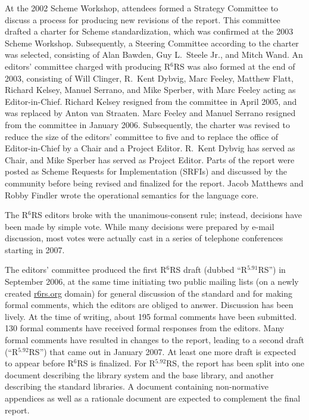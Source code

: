 \documentclass{sigplanconf}
\newcommand{\rn}[1]{R$^{#1}$RS}
\begin{document}
At the 2002 Scheme Workshop, attendees formed a Strategy Committee to
discuss a process for producing new revisions of the report.  This
committee drafted a charter for Scheme standardization, which was
confirmed at the 2003 Scheme Workshop.  Subsequently, a Steering
Committee according to the charter was selected, consisting of Alan
Bawden, Guy L.\ Steele Jr., and Mitch Wand.  An editors' committee
charged with producing \rn{6} was also formed at the end of 2003,
consisting of Will Clinger, R.\ Kent Dybvig, Marc Feeley, Matthew
Flatt, Richard Kelsey, Manuel Serrano, and Mike Sperber, with Marc
Feeley acting as Editor-in-Chief.  Richard Kelsey resigned from the
committee in April 2005, and was replaced by Anton van Straaten.  Marc
Feeley and Manuel Serrano resigned from the committee in January 2006.
Subsequently, the charter was revised to reduce the size of the
editors' committee to five and to replace the office of
Editor-in-Chief by a Chair and a Project Editor.  R.\ Kent Dybvig
has served as Chair, and Mike Sperber has served as Project Editor.  Parts of
the report were posted as Scheme Requests for Implementation (SRFIs)
and discussed by the community before being revised and finalized for
the report.  Jacob Matthews and Robby Findler wrote the operational
semantics for the language core.

The \rn{6} editors broke with the unanimous-consent rule; instead,
decisions have been made by simple vote.  While many decisions were
prepared by e-mail discussion, most votes were actually cast in a
series of telephone conferences starting in 2007.

The editors' committee produced the first \rn{6} draft (dubbed
``\rn{5.91}'') in September 2006, at the same time initiating two
public mailing lists (on a newly created \url{r6rs.org} domain) for general
discussion of the standard and for making formal comments, which the
editors are obliged to answer.  Discussion has been lively.  At the
time of writing, about 195 formal comments have been submitted.  130
formal comments have received formal responses from the editors.  Many
formal comments have resulted in changes to the report, leading to a
second draft (``\rn{5.92}'') that came out in January 2007.  At least one
more draft is expected to appear before \rn{6} is finalized.  For
\rn{5.92}, the report has been split into one document describing the
library system and the base library, and another describing the
standard libraries.  A document containing non-normative appendices as
well as a rationale document are expected to complement the final
report.
\end{document}
